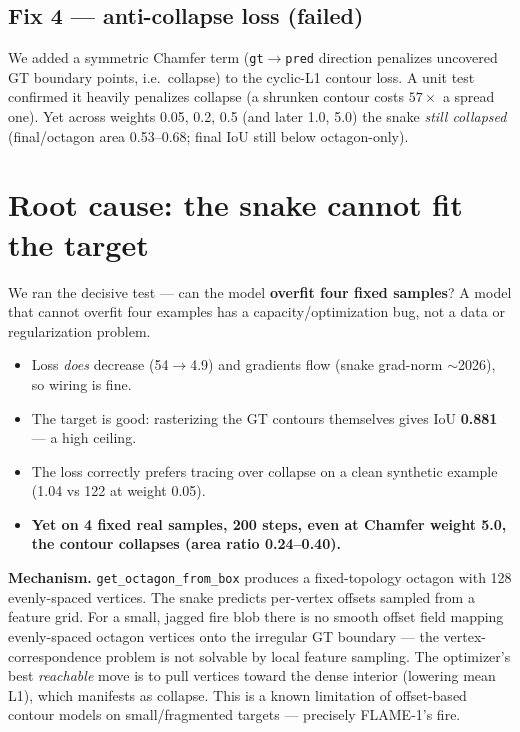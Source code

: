 \documentclass[10pt]{article}
\begin{document}
\subsection*{Fix 4 --- anti-collapse loss (failed)}
We added a symmetric Chamfer term (\texttt{gt$\to$pred} direction penalizes
uncovered GT boundary points, i.e.\ collapse) to the cyclic-L1 contour loss. A
unit test confirmed it heavily penalizes collapse (a shrunken contour costs
$57\times$ a spread one). Yet across weights 0.05, 0.2, 0.5 (and later 1.0, 5.0)
the snake \emph{still collapsed} (final/octagon area 0.53--0.68; final IoU still
below octagon-only).

\section{Root cause: the snake cannot fit the target}

We ran the decisive test --- can the model \textbf{overfit four fixed samples}?
A model that cannot overfit four examples has a capacity/optimization bug, not a
data or regularization problem.

\begin{itemize}
\item Loss \emph{does} decrease (54$\to$4.9) and gradients flow (snake grad-norm
  $\sim$2026), so wiring is fine.
\item The target is good: rasterizing the GT contours themselves gives IoU
  \textbf{0.881} --- a high ceiling.
\item The loss correctly prefers tracing over collapse on a clean synthetic
  example (1.04 vs 122 at weight 0.05).
\item \textbf{Yet on 4 fixed real samples, 200 steps, even at Chamfer weight 5.0,
  the contour collapses (area ratio 0.24--0.40).}
\end{itemize}

\textbf{Mechanism.} \texttt{get\_octagon\_from\_box} produces a fixed-topology
octagon with 128 evenly-spaced vertices. The snake predicts per-vertex offsets
sampled from a feature grid. For a small, jagged fire blob there is no smooth
offset field mapping evenly-spaced octagon vertices onto the irregular GT
boundary --- the vertex-correspondence problem is not solvable by local feature
sampling. The optimizer's best \emph{reachable} move is to pull vertices toward
the dense interior (lowering mean L1), which manifests as collapse. This is a
known limitation of offset-based contour models on small/fragmented targets ---
precisely FLAME-1's fire.
\end{document}
